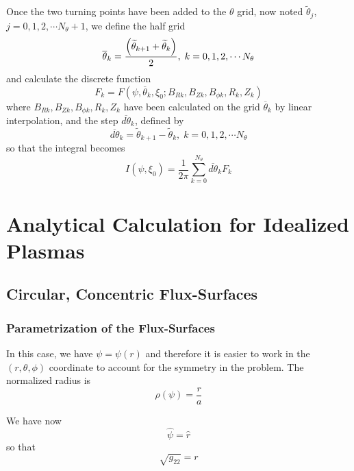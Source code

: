 \documentclass{article}
\begin{document}
Once the two turning points have been added to the $\theta $ grid, now noted 
$\widetilde{\theta }_{j}$, $j=0,1,2,\cdots N_{\theta }+1$, we define the
half grid 
\begin{equation}
\overline{\theta }_{k}=\frac{\left( \widetilde{\theta }_{k+1}+\widetilde{%
\theta }_{k}\right) }{2},\;k=0,1,2,\cdots N_{\theta }
\end{equation}
and calculate the discrete function 
\begin{equation}
F_{k}=F\left( \psi ,\overline{\theta }_{k},\xi _{0};B_{Rk},B_{Zk},B_{\phi
k},R_{k},Z_{k}\right)
\end{equation}
where $B_{Rk},B_{Zk},B_{\phi k},R_{k},Z_{k}$ have been calculated on the
grid $\overline{\theta }_{k}$ by linear interpolation, and the step $%
\overline{d\theta }_{k}$, defined by 
\begin{equation}
\overline{d\theta }_{k}=\widetilde{\theta }_{k+1}-\widetilde{\theta }%
_{k},\;k=0,1,2,\cdots N_{\theta }
\end{equation}
so that the integral becomes 
\begin{equation}
I\left( \psi ,\xi _{0}\right) =\frac{1}{2\pi }\sum_{k=0}^{N_{\theta }}%
\overline{d\theta }_{k}F_{k}
\end{equation}

\section{Analytical Calculation for Idealized Plasmas}

\subsection{Circular, Concentric Flux-Surfaces\label{circonc}}

\subsubsection{Parametrization of the Flux-Surfaces}

In this case, we have $\psi =\psi \left( r\right) $ and therefore it is
easier to work in the $\left( r,\theta ,\phi \right) $ coordinate to account
for the symmetry in the problem. The normalized radius is 
\[
\rho \left( \psi \right) =\frac{r}{a} 
\]

We have now 
\[
\widehat{\psi }=\widehat{r} 
\]
so that 
\begin{equation}
\sqrt{g_{22}}=r  \label{g22circ}
\end{equation}
\end{document}
